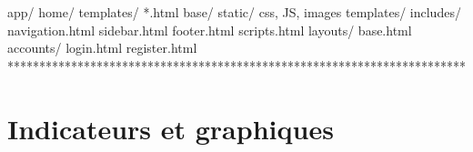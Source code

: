 \documentclass[letterpaper,10pt,french]{sphinxmanual}
\begin{document}
\begin{sphinxVerbatim}[commandchars=\\\{\}]
\PYGZhy{}\PYGZhy{} app/
    \PYGZhy{}\PYGZhy{} home/
         \PYGZhy{}\PYGZhy{} templates/                       
                 \PYGZhy{}\PYGZhy{} *.html
    \PYGZhy{}\PYGZhy{} base/
         \PYGZhy{}\PYGZhy{} static/
             \PYGZhy{}\PYGZhy{} \PYGZlt{}css, JS, images\PYGZgt{}          
         
         \PYGZhy{}\PYGZhy{} templates/                      
              
              \PYGZhy{}\PYGZhy{} includes/
                  \PYGZhy{}\PYGZhy{} navigation.html       
                  \PYGZhy{}\PYGZhy{} sidebar.html          
                  \PYGZhy{}\PYGZhy{} footer.html           
                  \PYGZhy{}\PYGZhy{} scripts.html          
              
              \PYGZhy{}\PYGZhy{} layouts/                   
                  \PYGZhy{}\PYGZhy{} base.html             
              
              \PYGZhy{}\PYGZhy{} accounts/                  
                   \PYGZhy{}\PYGZhy{} login.html            
                   \PYGZhy{}\PYGZhy{} register.html         
\PYGZhy{}\PYGZhy{} ************************************************************************
\end{sphinxVerbatim}


\section{Indicateurs et graphiques}
\label{\detokenize{indicateurs:indicateurs-et-graphiques}}\label{\detokenize{indicateurs:indic}}\label{\detokenize{indicateurs::doc}}
\end{document}
